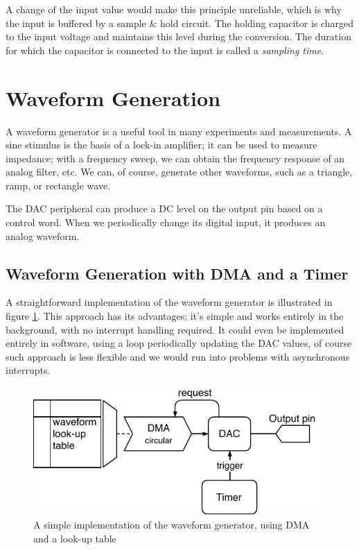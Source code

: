 A change of the input value would make this principle unreliable, which is why the input is buffered by a sample \& hold circuit. The holding capacitor is charged to the input voltage and maintains this level during the conversion. The duration for which the capacitor is connected to the input is called a \textit{sampling time}.

\section{Waveform Generation} \label{sec:theory-dac}

A waveform generator is a useful tool in many experiments and measurements. A sine stimulus is the basis of a lock-in amplifier; it can be used to measure impedance; with a frequency sweep, we can obtain the frequency response of an analog filter, etc. We can, of course, generate other waveforms, such as a triangle, ramp, or rectangle wave.

The DAC peripheral can produce a DC level on the output pin based on a control word. When we periodically change its digital input, it produces an analog waveform. 

\subsection{Waveform Generation with DMA and a Timer} \label{sec:theory-dac-simple}

A straightforward implementation of the waveform generator is illustrated in figure \ref{fig:wavegen-naive}. This approach has its advantages: it's simple and works entirely in the background, with no interrupt handling required. It could even be implemented entirely in software, using a loop periodically updating the DAC values, of course such approach is less flexible and we would run into problems with asynchronous interrupts.

\begin{figure}[h]
	\centering
	\includegraphics[scale=1.1] {img/wavegen-naive.pdf}
	\caption[A simple implementation of the waveform generator]{\label{fig:wavegen-naive}A simple implementation of the waveform generator, using DMA and a look-up table}
\end{figure}


